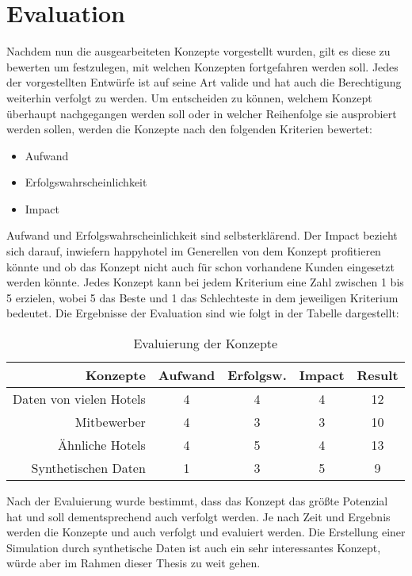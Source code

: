 \section{Evaluation}
\label{sec:eval_konzept}
Nachdem nun die ausgearbeiteten Konzepte vorgestellt wurden, gilt es diese zu bewerten um festzulegen, mit welchen Konzepten fortgefahren werden soll. Jedes der vorgestellten Entwürfe ist auf seine Art valide und hat auch die Berechtigung weiterhin verfolgt zu werden. Um entscheiden zu können, welchem Konzept überhaupt nachgegangen werden soll oder in welcher Reihenfolge sie ausprobiert werden sollen, werden die Konzepte nach den folgenden Kriterien bewertet:
\begin{itemize}
    \item Aufwand
    \item Erfolgswahrscheinlichkeit
    \item Impact
\end{itemize}
Aufwand und Erfolgswahrscheinlichkeit sind selbsterklärend. Der Impact bezieht sich darauf, inwiefern happyhotel im Generellen von dem Konzept profitieren könnte und ob das Konzept nicht auch für schon vorhandene Kunden eingesetzt werden könnte.
\newline
\newline
Jedes Konzept kann bei jedem Kriterium eine Zahl zwischen 1 bis 5 erzielen, wobei 5 das Beste und 1 das Schlechteste in dem jeweiligen Kriterium bedeutet. Die Ergebnisse der Evaluation sind wie folgt in der Tabelle dargestellt:
\begin{table}[ht]
    \centering
    \begin{tabularx}{\textwidth}{|d|c|c|c|c|}
        \textbf{Konzepte} & \textbf{Aufwand} & \textbf{Erfolgsw.} & \textbf{Impact} & \textbf{Result} \\
        \hline
        Daten von vielen Hotels & 4       & 4            & 4      & 12 
        \\
        Mitbewerber             & 4       & 3            & 3      & 10                \\
        Ähnliche Hotels         & 4       & 5            & 4      & 13  
        \\
        Synthetischen Daten     & 1       & 3            & 5      & 9   \\
    \end{tabularx}
    \caption[Evaluierung der Konzepte]{Evaluierung der Konzepte}
    \label{table:eval_kozepts}
\end{table}

Nach der Evaluierung wurde bestimmt, dass das Konzept \emph{} das größte Potenzial hat und soll dementsprechend auch verfolgt werden. Je nach Zeit und Ergebnis werden die Konzepte \emph{} und \emph{} auch verfolgt und evaluiert werden. Die Erstellung einer Simulation durch synthetische Daten ist auch ein sehr interessantes Konzept, würde aber im Rahmen dieser Thesis zu weit gehen.